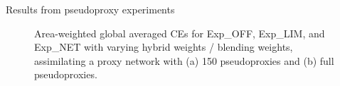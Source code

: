\documentclass[final]{beamer}
\newlength{\colwidth}
\begin{document}
\begin{frame}[t]
\begin{columns}[t]
\begin{column}{\colwidth}
\begin{alertblock}{Results from pseudoproxy experiments}
\begin{figure}
\begin{minipage}[t]{0.8\textwidth}
\begin{minipage}[t]{0.49\textwidth}
                            \end{minipage}
                            \begin{minipage}[t]{0.49\textwidth}
                            \end{minipage}    
                            \caption{Area-weighted global averaged CEs for Exp\_OFF, Exp\_LIM, and Exp\_NET with varying hybrid weights / blending weights, assimilating a proxy network with (a) 150 pseudoproxies and (b) full pseudoproxies.}\label{fig4}
                        \end{minipage}
                    \end{figure}
    			\end{alertblock}
    

\end{column}
\end{columns}
\end{frame}
\end{document}
